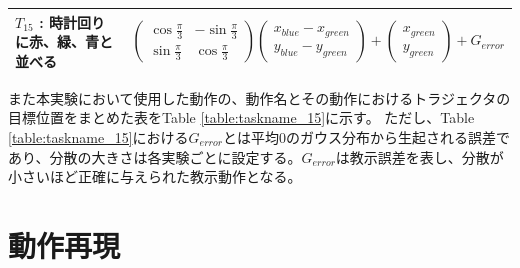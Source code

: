 \begin{table}[h]
\begin{tabular}{|l|l|}
    	$T_{15}$ : 時計回りに赤、緑、青と並べる & 
	$
	\begin{pmatrix}
        	\cos \frac{\pi}{3} & -\sin \frac{\pi}{3} \\
        	\sin \frac{\pi}{3} & \cos \frac{\pi}{3}
	\end{pmatrix}
	\begin{pmatrix}
        	x_{blue}-x_{green} \\
        	y_{blue}-y_{green}
	\end{pmatrix}
      	+
	\begin{pmatrix}
        	x_{green} \\
        	y_{green}
	\end{pmatrix}      	
	+G_{error}
    	$
    	\\ \hline
  	\end{tabular}
\end{table}
また本実験において使用した動作の、動作名とその動作におけるトラジェクタの目標位置をまとめた表をTable \ref{table:taskname_15}に示す。
ただし、Table \ref{table:taskname_15}における$G_{error}$とは平均0のガウス分布から生起される誤差であり、分散の大きさは各実験ごとに設定する。$G_{error}$は教示誤差を表し、分散が小さいほど正確に与えられた教示動作となる。


\section{動作再現}

